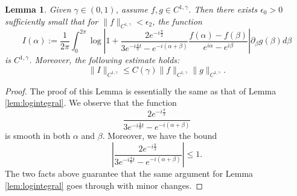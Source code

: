 \documentclass[11pt,reqno]{amsproc}
\newtheorem{lemma}{Lemma}
\newcommand{\eps}{\epsilon}
\newcommand{\p}{\partial}
\newcommand{\pb}{\p_\beta}
\begin{document}
\begin{lemma}\label{lem:logintegral2}
    Given $\gamma \in (0,1)$, assume $f, g \in C^{1,\gamma}$. Then there exists $\eps_0 > 0$ sufficiently small that for $\|f\|_{C^{1,\gamma}} < \eps_2$, the function
    \begin{equation}
        \label{eq:logintegral2}
        I(\alpha) := \frac{1}{2\pi}\int_0^{2\pi} \log \left|1 + \frac{2e^{-i\frac\pi2}}{3e^{-i\frac49 t} - e^{-i(\alpha + \beta)}}\frac{f(\alpha) - f(\beta)}{e^{i\alpha} - e^{i\beta}}\right| \pb g(\beta) d\beta
    \end{equation}
    is $C^{1,\gamma}$. Moreover, the following estimate holds:
    \begin{equation}
        \label{est:logintegral2}
        \|I\|_{C^{1,\gamma}} \le C(\gamma)\|f\|_{C^{1,\gamma}}\|g\|_{C^{1,\gamma}}.
    \end{equation}
\end{lemma}
\begin{proof}
    The proof of this Lemma is essentially the same as that of Lemma \ref{lem:logintegral}. We observe that the function
    $$
    \frac{2e^{-i\frac\pi2}}{3e^{-i\frac49 t} - e^{-i(\alpha + \beta)}}
    $$
    is smooth in both $\alpha$ and $\beta$. Moreover, we have the bound
    $$
    \left|\frac{2e^{-i\frac\pi2}}{3e^{-i\frac49 t} - e^{-i(\alpha + \beta)}}\right| \le 1.
    $$
    The two facts above guarantee that the same argument for Lemma \ref{lem:logintegral} goes through with minor changes.
\end{proof}
\end{document}
